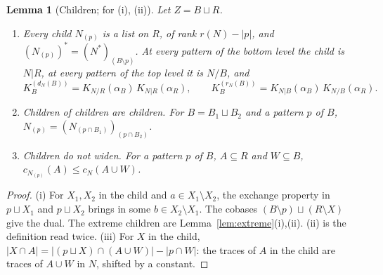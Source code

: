 \documentclass[11pt]{article}
\theoremstyle{plain}
\newtheorem{lemma}[prop]{Lemma}
\theoremstyle{definition}
\theoremstyle{remark}
\begin{document}
\begin{lemma}[Children; {\cite[Lemma~12.2, p.~70; Thm.~12.17, p.~73; Prop.~14.5, p.~82]{F}} for (i), (ii)]\label{lem:children}
Let $Z=B\sqcup R$.
\begin{enumerate}[label=(\roman*)]
\item Every child $N_{(p)}$ is a list on $R$, of rank $r(N)-|p|$, and $(N_{(p)})^\ast=(N^\ast)_{(B\setminus p)}$. At every pattern of the bottom level the child is $N|R$, at every pattern of the top level it is $N/B$, and
\[
K^{(d_N(B))}_B=K_{N/R}(\alpha_B)\,K_{N|R}(\alpha_R),\qquad K^{(r_N(B))}_B=K_{N|B}(\alpha_B)\,K_{N/B}(\alpha_R).
\]
\item \emph{Children of children are children.} For $B=B_1\sqcup B_2$ and a pattern $p$ of $B$, $N_{(p)}=(N_{(p\cap B_1)})_{(p\cap B_2)}$.
\item \emph{Children do not widen.} For a pattern $p$ of $B$, $A\subseteq R$ and $W\subseteq B$, $c_{N_{(p)}}(A)\le c_N(A\cup W)$.
\end{enumerate}
\end{lemma}

\begin{proof}
(i) For $X_1,X_2$ in the child and $a\in X_1\setminus X_2$, the exchange property in $p\sqcup X_1$ and $p\sqcup X_2$ brings in some $b\in X_2\setminus X_1$. The cobases $(B\setminus p)\sqcup(R\setminus X)$ give the dual. The extreme children are Lemma~\ref{lem:extreme}(i),(ii). (ii) is the definition read twice. (iii) For $X$ in the child, $|X\cap A|=|(p\sqcup X)\cap(A\cup W)|-|p\cap W|$: the traces of $A$ in the child are traces of $A\cup W$ in $N$, shifted by a constant.
\end{proof}
\end{document}
